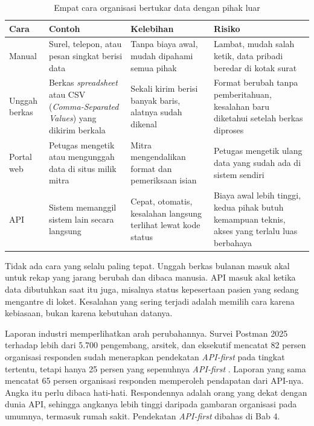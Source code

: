 \begin{table}[!htb]
  \centering
  \caption{Empat cara organisasi bertukar data dengan pihak luar}
  \label{tab:ch01-cara-pertukaran}
  \begin{tabularx}{\textwidth}{>{\raggedright\arraybackslash}p{1.6cm}
                               >{\raggedright\arraybackslash}X
                               >{\raggedright\arraybackslash}X
                               >{\raggedright\arraybackslash}X}
    \hline
    \textbf{Cara} & \textbf{Contoh} & \textbf{Kelebihan} & \textbf{Risiko} \\
    \hline
    Manual & Surel, telepon, atau pesan singkat berisi data & Tanpa biaya awal, mudah dipahami semua pihak & Lambat, mudah salah ketik, data pribadi beredar di kotak surat \\
    \hline
    Unggah berkas & Berkas \textit{spreadsheet} atau CSV (\textit{Comma-Separated Values}) yang dikirim berkala & Sekali kirim berisi banyak baris, alatnya sudah dikenal & Format berubah tanpa pemberitahuan, kesalahan baru diketahui setelah berkas diproses \\
    \hline
    Portal web & Petugas mengetik atau mengunggah data di situs milik mitra & Mitra mengendalikan format dan pemeriksaan isian & Petugas mengetik ulang data yang sudah ada di sistem sendiri \\
    \hline
    API & Sistem memanggil sistem lain secara langsung & Cepat, otomatis, kesalahan langsung terlihat lewat kode status & Biaya awal lebih tinggi, kedua pihak butuh kemampuan teknis, akses yang terlalu luas berbahaya \\
    \hline
  \end{tabularx}
\end{table}

Tidak ada cara yang selalu paling tepat. Unggah berkas bulanan masuk akal untuk
rekap yang jarang berubah dan dibaca manusia. API masuk akal ketika data
dibutuhkan saat itu juga, misalnya status kepesertaan pasien yang sedang mengantre
di loket. Kesalahan yang sering terjadi adalah memilih cara karena kebiasaan,
bukan karena kebutuhan datanya.

Laporan industri memperlihatkan arah perubahannya. Survei Postman 2025 terhadap
lebih dari 5.700 pengembang, arsitek, dan eksekutif mencatat 82 persen organisasi
responden sudah menerapkan pendekatan \textit{API-first} pada tingkat tertentu,
tetapi hanya 25 persen yang sepenuhnya \textit{API-first} \cite{postman2025}.
Laporan yang sama mencatat 65 persen organisasi responden memperoleh pendapatan
dari API-nya. Angka itu perlu dibaca hati-hati. Respondennya adalah orang yang
dekat dengan dunia API, sehingga angkanya lebih tinggi daripada gambaran
organisasi pada umumnya, termasuk rumah sakit. Pendekatan \textit{API-first}
dibahas di Bab 4.


